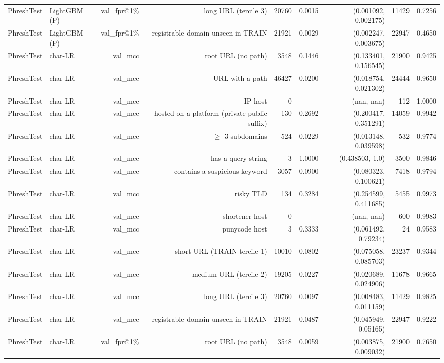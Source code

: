 \begin{table}[t]
\begin{tabular}{llrrrrrrr}
PhreshTest & LightGBM (P) & val\_fpr@1\% & long URL (tercile 3) & 20760 & 0.0015 & (0.001092, 0.002175) & 11429 & 0.7256 \\
PhreshTest & LightGBM (P) & val\_fpr@1\% & registrable domain unseen in TRAIN & 21921 & 0.0029 & (0.002247, 0.003675) & 22947 & 0.4650 \\
PhreshTest & char-LR & val\_mcc & root URL (no path) & 3548 & 0.1446 & (0.133401, 0.156545) & 21900 & 0.9425 \\
PhreshTest & char-LR & val\_mcc & URL with a path & 46427 & 0.0200 & (0.018754, 0.021302) & 24444 & 0.9650 \\
PhreshTest & char-LR & val\_mcc & IP host & 0 & -- & (nan, nan) & 112 & 1.0000 \\
PhreshTest & char-LR & val\_mcc & hosted on a platform (private public suffix) & 130 & 0.2692 & (0.200417, 0.351291) & 14059 & 0.9942 \\
PhreshTest & char-LR & val\_mcc & $\geq$ 3 subdomains & 524 & 0.0229 & (0.013148, 0.039598) & 532 & 0.9774 \\
PhreshTest & char-LR & val\_mcc & has a query string & 3 & 1.0000 & (0.438503, 1.0) & 3500 & 0.9846 \\
PhreshTest & char-LR & val\_mcc & contains a suspicious keyword & 3057 & 0.0900 & (0.080323, 0.100621) & 7418 & 0.9794 \\
PhreshTest & char-LR & val\_mcc & risky TLD & 134 & 0.3284 & (0.254599, 0.411685) & 5455 & 0.9973 \\
PhreshTest & char-LR & val\_mcc & shortener host & 0 & -- & (nan, nan) & 600 & 0.9983 \\
PhreshTest & char-LR & val\_mcc & punycode host & 3 & 0.3333 & (0.061492, 0.79234) & 24 & 0.9583 \\
PhreshTest & char-LR & val\_mcc & short URL (TRAIN tercile 1) & 10010 & 0.0802 & (0.075058, 0.085703) & 23237 & 0.9344 \\
PhreshTest & char-LR & val\_mcc & medium URL (tercile 2) & 19205 & 0.0227 & (0.020689, 0.024906) & 11678 & 0.9665 \\
PhreshTest & char-LR & val\_mcc & long URL (tercile 3) & 20760 & 0.0097 & (0.008483, 0.011159) & 11429 & 0.9825 \\
PhreshTest & char-LR & val\_mcc & registrable domain unseen in TRAIN & 21921 & 0.0487 & (0.045949, 0.05165) & 22947 & 0.9222 \\
PhreshTest & char-LR & val\_fpr@1\% & root URL (no path) & 3548 & 0.0059 & (0.003875, 0.009032) & 21900 & 0.7650 \\

\end{tabular}
\end{table}
